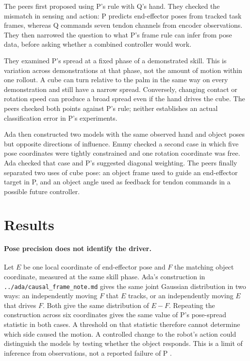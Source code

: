 \documentclass{article}
\begin{document}
The peers first proposed using P's rule with Q's hand. They checked the mismatch in sensing and action: P
predicts end-effector poses from tracked task frames, whereas Q commands seven tendon channels from
encoder observations. They then narrowed the question to what P's frame rule can infer from pose data,
before asking whether a combined controller would work.

They examined P's spread at a fixed phase of a demonstrated skill. This is variation across
demonstrations at that phase, not the amount of motion within one rollout. A cube can turn relative to
the palm in the same way on every demonstration and still have a narrow spread. Conversely, changing
contact or rotation speed can produce a broad spread even if the hand drives the cube. The peers checked
both points against P's rule; neither establishes an actual classification error in P's experiments.

Ada then constructed two models with the same observed hand and object poses but opposite directions of
influence. Emmy checked a second case in which five pose coordinates were tightly constrained and one
rotation coordinate was free. Ada checked that case and P's suggested diagonal weighting. The peers
finally separated two uses of cube pose: an object frame used to guide an end-effector target in P, and
an object angle used as feedback for tendon commands in a possible future controller.

\section{Results}

\paragraph{Pose precision does not identify the driver.}
Let \(E\) be one local coordinate of end-effector pose and \(F\) the matching object coordinate, measured
at the same skill phase. Ada's construction in \texttt{../ada/causal\_frame\_note.md} gives the same
joint Gaussian distribution in two ways: an independently moving \(F\) that \(E\) tracks, or an
independently moving \(E\) that drives \(F\). Both give the same distribution of \(E-F\). Repeating the
construction across six coordinates gives the same value of P's pose-spread statistic in both cases. A
threshold on that statistic therefore cannot determine which side caused the motion. A controlled change
to the robot's action could distinguish the models by testing whether the object responds. This is a
limit of inference from observations, not a reported failure of P \cite{P}.
\end{document}
